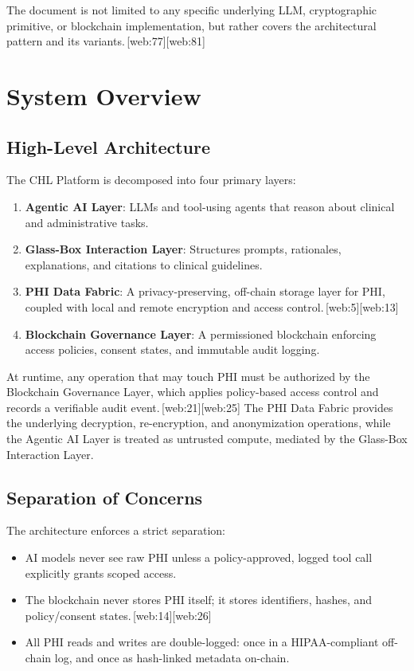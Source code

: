 \documentclass[11pt]{article}
\begin{document}
The document is not limited to any specific underlying LLM, cryptographic primitive, or blockchain implementation, but rather covers the architectural pattern and its variants.\,[web:77][web:81]

\section{System Overview}

\subsection{High-Level Architecture}

The CHL Platform is decomposed into four primary layers:
\begin{enumerate}[label=\arabic*., nosep]
  \item \textbf{Agentic AI Layer}: LLMs and tool-using agents that reason about clinical and administrative tasks.
  \item \textbf{Glass-Box Interaction Layer}: Structures prompts, rationales, explanations, and citations to clinical guidelines.
  \item \textbf{PHI Data Fabric}: A privacy-preserving, off-chain storage layer for PHI, coupled with local and remote encryption and access control.\,[web:5][web:13]
  \item \textbf{Blockchain Governance Layer}: A permissioned blockchain enforcing access policies, consent states, and immutable audit logging.
\end{enumerate}

At runtime, any operation that may touch PHI must be authorized by the Blockchain Governance Layer, which applies policy-based access control and records a verifiable audit event.\,[web:21][web:25] 
The PHI Data Fabric provides the underlying decryption, re-encryption, and anonymization operations, while the Agentic AI Layer is treated as untrusted compute, mediated by the Glass-Box Interaction Layer.

\subsection{Separation of Concerns}

The architecture enforces a strict separation:
\begin{itemize}[nosep]
  \item AI models never see raw PHI unless a policy-approved, logged tool call explicitly grants scoped access.
  \item The blockchain never stores PHI itself; it stores identifiers, hashes, and policy/consent states.\,[web:14][web:26]
  \item All PHI reads and writes are double-logged: once in a HIPAA-compliant off-chain log, and once as hash-linked metadata on-chain.
\end{itemize}
\end{document}
